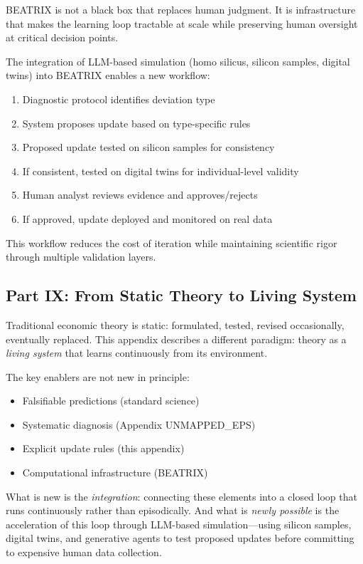 BEATRIX is not a black box that replaces human judgment. It is infrastructure 
that makes the learning loop tractable at scale while preserving human oversight 
at critical decision points.

The integration of LLM-based simulation (homo silicus, silicon samples, digital 
twins) into BEATRIX enables a new workflow:
\begin{enumerate}
    \item Diagnostic protocol identifies deviation type
    \item System proposes update based on type-specific rules
    \item Proposed update tested on silicon samples for consistency
    \item If consistent, tested on digital twins for individual-level validity
    \item Human analyst reviews evidence and approves/rejects
    \item If approved, update deployed and monitored on real data
\end{enumerate}

This workflow reduces the cost of iteration while maintaining scientific rigor 
through multiple validation layers.

\subsection{Part IX: From Static Theory to Living System}

Traditional economic theory is static: formulated, tested, revised occasionally, 
eventually replaced. This appendix describes a different paradigm: theory as a 
\emph{living system} that learns continuously from its environment.

The key enablers are not new in principle:
\begin{itemize}
    \item Falsifiable predictions (standard science)
    \item Systematic diagnosis (Appendix UNMAPPED_EPS)
    \item Explicit update rules (this appendix)
    \item Computational infrastructure (BEATRIX)
\end{itemize}

What is new is the \emph{integration}: connecting these elements into a 
closed loop that runs continuously rather than episodically. And what is 
\emph{newly possible} is the acceleration of this loop through LLM-based 
simulation---using silicon samples, digital twins, and generative agents to 
test proposed updates before committing to expensive human data collection.

